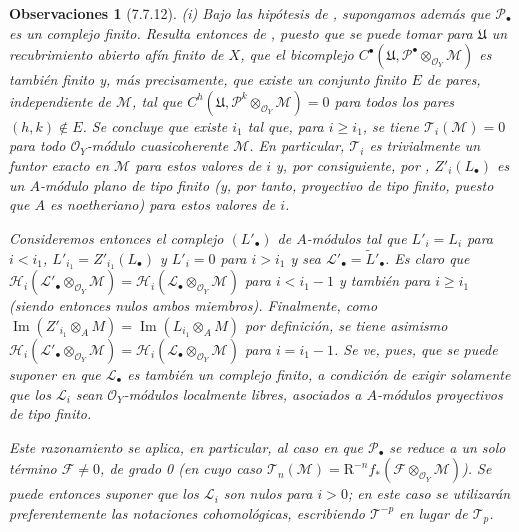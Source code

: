 \documentclass[10pt,oneside,openany]{book}
\theoremstyle{egaenv}\newtheorem*{env}{---}
\theoremstyle{egastatement}
\theoremstyle{egadescription}
\newtheorem*{remarks}{Observaciones}
\renewcommand{\geq}{\geqslant}
\begin{document}
\begin{remarks}[7.7.12]
\label{III.7.7.12}
\textnormal{(i)} Bajo las hipótesis de , supongamos además que
$\mathscr P_\bullet$ es un complejo \emph{finito}. Resulta entonces de
, puesto que se puede tomar para $\mathfrak U$ un
recubrimiento abierto afín \emph{finito} de $X$, que el bicomplejo
$C^\bullet(\mathfrak U,\mathscr P^\bullet\otimes_{\mathscr O_Y}\mathscr M)$ es también \emph{finito} y, más
precisamente, que existe un conjunto finito $E$ de pares, \emph{independiente
de $\mathscr M$}, tal que
$C^h(\mathfrak U,\mathscr P^k\otimes_{\mathscr O_Y}\mathscr M)=0$ para todos los pares $(h,k)\notin E$.
Se concluye que existe $i_1$ tal que, para $i\geq i_1$, se tiene
$\mathscr T_i(\mathscr M)=0$ para \emph{todo} $\mathscr O_Y$-módulo
cuasicoherente $\mathscr M$. En particular, $\mathscr T_i$ es trivialmente un
funtor exacto en $\mathscr M$ para estos valores de $i$ y, por consiguiente,
por , $Z'_i(L_\bullet)$ es un $A$-módulo \emph{plano} de tipo
finito (y, por tanto, \emph{proyectivo} de tipo finito, puesto que $A$ es
noetheriano) para estos valores de $i$.

Consideremos entonces el complejo $(L'_\bullet)$ de $A$-módulos tal que
$L'_i=L_i$ para $i<i_1$, $L'_{i_1}=Z'_{i_1}(L_\bullet)$ y $L'_i=0$ para
$i>i_1$ y sea $\mathscr L'_\bullet=\widetilde{L}'_\bullet$. Es claro que
$  \mathscr H_i(\mathscr L'_\bullet\otimes_{\mathscr O_Y}\mathscr M)
  =
  \mathscr H_i(\mathscr L_\bullet\otimes_{\mathscr O_Y}\mathscr M)$
para $i<i_1-1$ y también para $i\geq i_1$ (siendo entonces nulos ambos
miembros). Finalmente, como
$\operatorname{Im}(Z'_{i_1}\otimes_A M)=\operatorname{Im}(L_{i_1}\otimes_A M)$
por definición, se tiene asimismo
$\mathscr H_i(\mathscr L'_\bullet\otimes_{\mathscr O_Y}\mathscr M)
=\mathscr H_i(\mathscr L_\bullet\otimes_{\mathscr O_Y}\mathscr M)$
para $i=i_1-1$. Se ve, pues, que se puede suponer en  que
$\mathscr L_\bullet$ es también un complejo \emph{finito}, a condición de
exigir solamente que los $\mathscr L_i$ sean $\mathscr O_Y$-módulos
\emph{localmente libres}, asociados a $A$-módulos proyectivos de tipo finito.

Este razonamiento se aplica, en particular, al caso en que
$\mathscr P_\bullet$ se reduce a \emph{un solo} término $\mathscr F\ne0$, de grado 0 (en cuyo caso
$\mathscr T_n(\mathscr M)=\mathrm R^{-n}f_*
(\mathscr F\otimes_{\mathscr O_Y}\mathscr M)$). Se puede entonces suponer que
los $\mathscr L_i$ son nulos para $i>0$; en este caso se utilizarán
preferentemente las notaciones cohomológicas, escribiendo $\mathscr T^{-p}$ en
lugar de $\mathscr T_p$.


\end{remarks}
\end{document}
